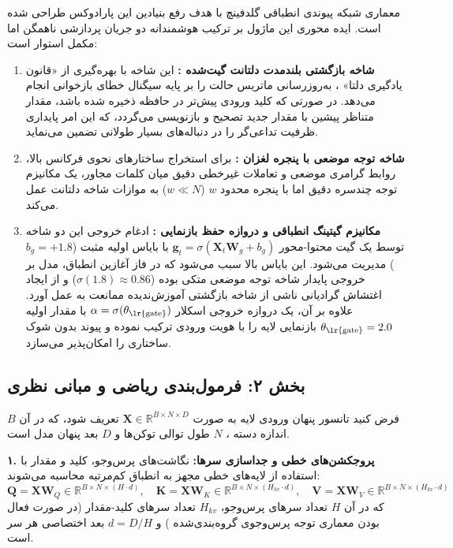 معماری شبکه پیوندی انطباقی گلدفینچ  با هدف رفع بنیادین این پارادوکس طراحی شده است. ایده محوری این ماژول بر ترکیب هوشمندانه دو جریان پردازشی ناهمگن اما مکمل استوار است:
\begin{enumerate}
    \item \textbf{شاخه بازگشتی بلندمدت دلتانت گیت‌شده :} این شاخه با بهره‌گیری از «قانون یادگیری دلتا» ، به‌روزرسانی ماتریس حالت را بر پایه سیگنال خطای بازخوانی انجام می‌دهد. در صورتی که کلید ورودی پیش‌تر در حافظه ذخیره شده باشد، مقدار متناظر پیشین با مقدار جدید تصحیح و بازنویسی می‌گردد، که این امر پایداری ظرفیت تداعی‌گر را در دنباله‌های بسیار طولانی تضمین می‌نماید.
    \item \textbf{شاخه توجه موضعی با پنجره لغزان :} برای استخراج ساختارهای نحوی فرکانس بالا، روابط گرامری موضعی و تعاملات غیرخطی دقیق میان کلمات مجاور، یک مکانیزم توجه چندسره دقیق اما با پنجره محدود $w$ ($w \ll N$) به موازات شاخه دلتانت عمل می‌کند.
    \item \textbf{مکانیزم گیتینگ انطباقی و دروازه حفظ بازنمایی :} ادغام خروجی این دو شاخه توسط یک گیت محتوا-محور $\mathbf{g}_t = \sigma(\mathbf{X}_t \mathbf{W}_g + b_g)$ با بایاس اولیه مثبت ($b_g = +1.8$) مدیریت می‌شود. این بایاس بالا سبب می‌شود که در فاز آغازین انطباق، مدل بر خروجی پایدار شاخه توجه موضعی متکی بوده ($\sigma(1.8) \approx 0.86$) و از ایجاد اغتشاش گرادیانی ناشی از شاخه بازگشتی آموزش‌ندیده ممانعت به عمل آورد. علاوه بر آن، یک دروازه خروجی اسکلار $\alpha = \sigma(\theta_{\text{\lr{gate}}})$ با مقدار اولیه $\theta_{\text{\lr{gate}}} = 2.0$ بازنمایی لایه را با هویت ورودی ترکیب نموده و پیوند بدون شوک ساختاری  را امکان‌پذیر می‌سازد.
\end{enumerate}

\subsection*{بخش ۲: فرمول‌بندی ریاضی و مبانی نظری }
فرض کنید تانسور پنهان ورودی لایه به صورت $\mathbf{X} \in \mathbb{R}^{B \times N \times D}$ تعریف شود، که در آن $B$ اندازه دسته ، $N$ طول توالی توکن‌ها  و $D$ بعد پنهان مدل  است.

\textbf{۱. پروجکشن‌های خطی و جداسازی سرها:}
نگاشت‌های پرس‌وجو، کلید و مقدار با استفاده از لایه‌های خطی مجهز به انطباق کم‌مرتبه  محاسبه می‌شوند:
\begin{equation}
\mathbf{Q} = \mathbf{X} \mathbf{W}_Q \in \mathbb{R}^{B \times N \times (H \cdot d)}, \quad \mathbf{K} = \mathbf{X} \mathbf{W}_K \in \mathbb{R}^{B \times N \times (H_{kv} \cdot d)}, \quad \mathbf{V} = \mathbf{X} \mathbf{W}_V \in \mathbb{R}^{B \times N \times (H_{kv} \cdot d)}
\end{equation}
که در آن $H$ تعداد سرهای پرس‌وجو، $H_{kv}$ تعداد سرهای کلید-مقدار (در صورت فعال بودن معماری توجه پرس‌وجوی گروه‌بندی‌شده ) و $d = D / H$ بعد اختصاصی هر سر است.

